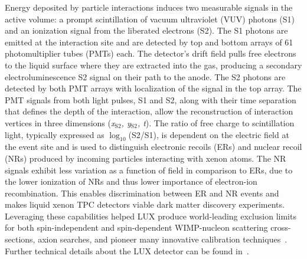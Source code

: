 \documentclass[11pt,a4paper]{article}
\newcommand{\subStwo}{$_{\textrm{S2}}$}
\begin{document}
Energy deposited by particle interactions induces two measurable signals in the active volume: a prompt scintillation of vacuum ultraviolet (VUV) photons (S1) and an ionization signal from the liberated electrons (S2). The S1 photons are emitted at the interaction site and are detected by top and bottom arrays of 61 photomultiplier tubes (PMTs) each. The detector's drift field pulls free electrons to the liquid surface where they are extracted into the gas, producing a secondary electroluminescence S2 signal on their path to the anode. The S2 photons are detected by both PMT arrays with localization of the signal in the top array. The PMT signals from both light pulses, S1 and S2, along with their time separation that defines the depth of the interaction, allow the reconstruction of interaction vertices in three dimensions (\textit{x\subStwo, y\subStwo, t}). The ratio of free charge to scintillation light, typically expressed as $\log_{10}$(S2/S1), is dependent on the electric field at the event site and is used to distinguish electronic recoils (ERs) and nuclear recoil (NRs) produced by incoming particles interacting with xenon atoms. The NR signals exhibit less variation as a function of field in comparison to ERs, due to the lower ionization of NRs and thus lower importance of electron-ion recombination. This enables discrimination between ER and NR events and makes liquid xenon TPC detectors viable dark matter discovery experiments. Leveraging these capabilities helped LUX produce world-leading exclusion limits for both spin-independent and spin-dependent WIMP-nucleon scattering cross-sections, axion searches, and pioneer many innovative calibration techniques~\cite{Akerib:2013tjd,Akerib:2015rjg,Akerib:2016lao,Akerib:2016vxi,Akerib:2017uem,Akerib:2017kat}. Further technical details about the LUX detector can be found in~\cite{Akerib:2012ys}.
\end{document}
